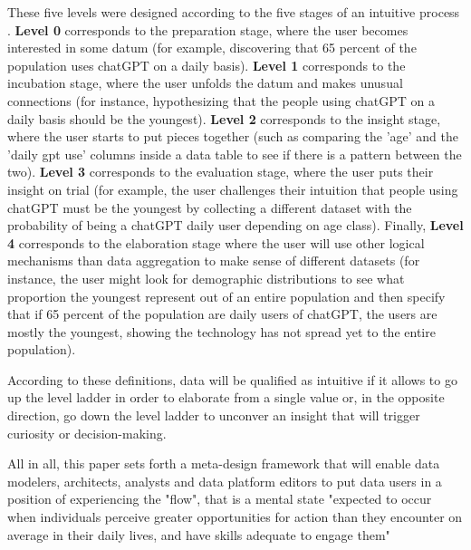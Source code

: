 \documentclass[Afour,times,sageh]{sagej}
\begin{document}
\noindent These five levels were designed according to the five stages of an intuitive process \citep{csikszentmihalyi1997flow}. \textbf{Level 0} corresponds to the preparation stage, where the user becomes interested in some datum (for example, discovering that 65 percent of the population uses chatGPT on a daily basis). \textbf{Level 1} corresponds to the incubation stage, where the user unfolds the datum and makes unusual connections (for instance, hypothesizing that the people using chatGPT on a daily basis should be the youngest). \textbf{Level 2} corresponds to the insight stage, where the user starts to put pieces together (such as comparing the 'age' and the 'daily gpt use' columns inside a data table to see if there is a pattern between the two). \textbf{Level 3} corresponds to the evaluation stage, where the user puts their insight on trial (for example, the user challenges their intuition that people using chatGPT must be the youngest by collecting a different dataset with the probability of being a chatGPT daily user depending on age class). Finally, \textbf{Level 4} corresponds to the elaboration stage where the user will use other logical mechanisms than data aggregation to make sense of different datasets (for instance, the user might look for demographic distributions to see what proportion the youngest represent out of an entire population and then specify that if 65 percent of the population are daily users of chatGPT, the users are mostly the youngest, showing the technology has not spread yet to the entire population).

\vspace{1em}

\noindent According to these definitions, data will be qualified as intuitive if it allows to go up the level ladder in order to elaborate from a single value or, in the opposite direction, go down the level ladder to unconver an insight that will trigger curiosity or decision-making. 

\vspace{1em}

\noindent All in all, this paper sets forth a meta-design framework that will enable data modelers, architects, analysts and data platform editors to put data users in a position of experiencing the "flow", that is a mental state "expected to occur when individuals perceive greater opportunities for action than they encounter on average in
their daily lives, and have skills adequate to engage them" \citep{nakamura2014concept}


\end{document}
